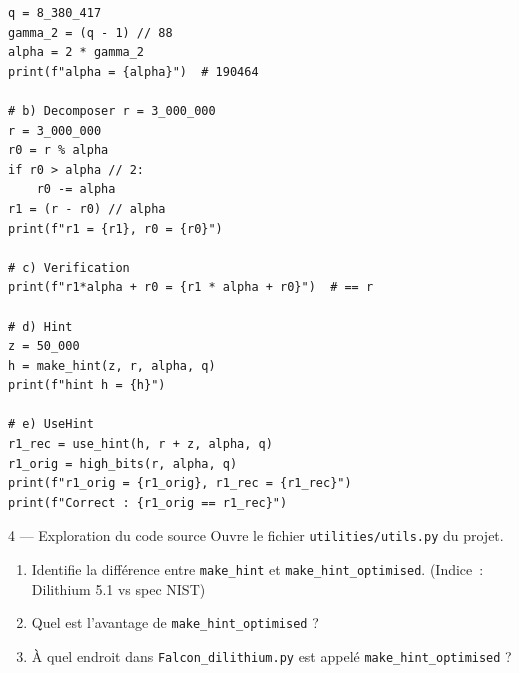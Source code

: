 \documentclass[12pt, a4paper]{article}
\begin{document}
\begin{solution}
\begin{lstlisting}[style=python]
q = 8_380_417
gamma_2 = (q - 1) // 88
alpha = 2 * gamma_2
print(f"alpha = {alpha}")  # 190464

# b) Decomposer r = 3_000_000
r = 3_000_000
r0 = r % alpha
if r0 > alpha // 2:
    r0 -= alpha
r1 = (r - r0) // alpha
print(f"r1 = {r1}, r0 = {r0}")

# c) Verification
print(f"r1*alpha + r0 = {r1 * alpha + r0}")  # == r

# d) Hint
z = 50_000
h = make_hint(z, r, alpha, q)
print(f"hint h = {h}")

# e) UseHint
r1_rec = use_hint(h, r + z, alpha, q)
r1_orig = high_bits(r, alpha, q)
print(f"r1_orig = {r1_orig}, r1_rec = {r1_rec}")
print(f"Correct : {r1_orig == r1_rec}")
\end{lstlisting}
\end{solution}

\begin{exercice}{4 --- Exploration du code source}
Ouvre le fichier \texttt{utilities/utils.py} du projet.
\begin{enumerate}[label=\alph*)]
  \item Identifie la différence entre \texttt{make\_hint} et \texttt{make\_hint\_optimised}.
        (Indice~: Dilithium 5.1 vs spec NIST)
  \item Quel est l'avantage de \texttt{make\_hint\_optimised} ?
  \item À quel endroit dans \texttt{Falcon\_dilithium.py} est appelé \texttt{make\_hint\_optimised} ?
\end{enumerate}
\end{exercice}
\end{document}
